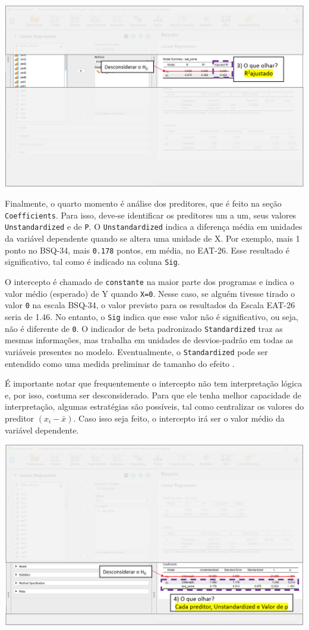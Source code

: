 \documentclass[
]{book}
\begin{document}
\includegraphics{./img/cap_reg_resultados3.png}

Finalmente, o quarto momento é análise dos preditores, que é feito na seção \texttt{Coefficients}. Para isso, deve-se identificar os preditores um a um, seus valores \texttt{Unstandardized} e de \texttt{P}. O \texttt{Unstandardized} indica a diferença média em unidades da variável dependente quando se altera uma unidade de X. Por exemplo, mais 1 ponto no BSQ-34, mais \texttt{0.178} pontos, em média, no EAT-26. Esse resultado é significativo, tal como é indicado na coluna \texttt{Sig}.

O intercepto é chamado de \texttt{constante} na maior parte dos programas e indica o valor médio (esperado) de Y quando \texttt{X=0}. Nesse caso, se alguém tivesse tirado o valor \texttt{0} na escala BSQ-34, o valor previsto para os resultados da Escala EAT-26 seria de 1.46. No entanto, o \texttt{Sig} indica que esse valor não é significativo, ou seja, não é diferente de \texttt{0}. O indicador de beta padronizado \texttt{Standardized} traz as mesmas informações, mas trabalha em unidades de desvios-padrão em todas as variáveis presentes no modelo. Eventualmente, o \texttt{Standardized} pode ser entendido como uma medida preliminar de tamanho do efeito \citep{fox2016}.

É importante notar que frequentemente o intercepto não tem interpretação lógica e, por isso, costuma ser desconsiderado. Para que ele tenha melhor capacidade de interpretação, algumas estratégias são possíveis, tal como centralizar os valores do preditor \((x_i-\bar{x})\). Caso isso seja feito, o intercepto irá ser o valor médio da variável dependente.

\includegraphics{./img/cap_reg_resultados4.png}
\end{document}
